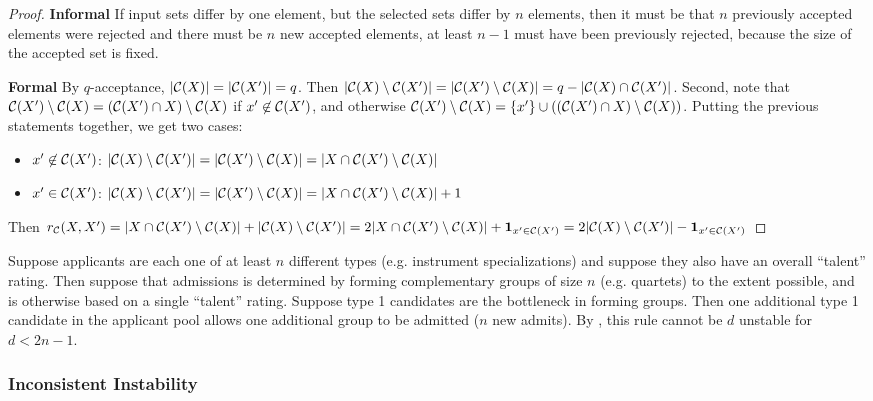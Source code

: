 \begin{proof}
\textbf{Informal}
If input sets differ by one element, but the selected sets differ by $n$ elements, then it must be that $n$ previously accepted elements were rejected and there must be $n$ new accepted elements, at least $n-1$ must have been previously rejected, because the size of the accepted set is fixed.

\textbf{Formal}
By $q$-acceptance, $|\mathcal{C}(X)| = |\mathcal{C}(X')| = q$. Then $|\mathcal{C}(X) \setminus \mathcal{C}(X')| = |\mathcal{C}(X') \setminus \mathcal{C}(X)| = q-|\mathcal{C}(X) \cap \mathcal{C}(X')|$.
Second, note that $\mathcal{C}(X') \setminus \mathcal{C}(X) = (\mathcal{C}(X') \cap X) \setminus \mathcal{C}(X)$ if $x' \not\in \mathcal{C}(X')$, and otherwise $\mathcal{C}(X') \setminus \mathcal{C}(X) = \{x'\} \cup \left((\mathcal{C}(X') \cap X) \setminus \mathcal{C}(X)\right)$.
Putting the previous statements together, we get two cases:
\begin{itemize}
    \item $x' \not\in \mathcal{C}(X')$: $|\mathcal{C}(X) \setminus \mathcal{C}(X')| = |\mathcal{C}(X') \setminus \mathcal{C}(X)| = |X \cap \mathcal{C}(X') \setminus \mathcal{C}(X)|$
    \item $x' \in \mathcal{C}(X')$: $|\mathcal{C}(X) \setminus \mathcal{C}(X')| = |\mathcal{C}(X') \setminus \mathcal{C}(X)| = |X \cap \mathcal{C}(X') \setminus \mathcal{C}(X)| + 1$
\end{itemize}
Then $r_{\mathcal{C}}(X, X') = |X \cap \mathcal{C}(X') \setminus \mathcal{C}(X)| + |\mathcal{C}(X) \setminus \mathcal{C}(X')| = 2|X \cap \mathcal{C}(X') \setminus \mathcal{C}(X)| + \mathbf{1}_{x'\in\mathcal{C}(X')} = 2|\mathcal{C}(X) \setminus \mathcal{C}(X')| - \mathbf{1}_{x'\in\mathcal{C}(X')}$
\end{proof}

\begin{example}
Suppose applicants are each one of at least
$n$ different types (e.g. instrument specializations) and suppose they also have an overall ``talent'' rating.
Then suppose that admissions is determined by forming complementary groups of size $n$ (e.g. quartets) to the extent possible, and is otherwise based on a single ``talent'' rating.
Suppose type 1 candidates are the bottleneck in forming groups.
Then one additional type 1 candidate in the applicant pool allows one additional group to be admitted ($n$ new admits). By , this rule cannot be $d$ unstable for $d<2n-1$.
\end{example}

\subsubsection{Inconsistent Instability}\label{sec:inconsistent-proof}


